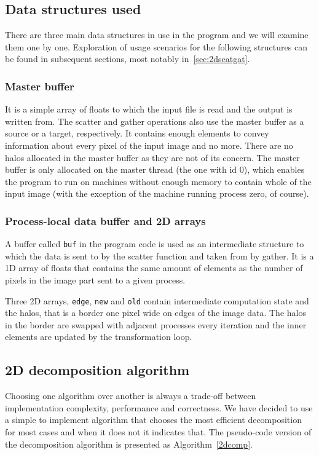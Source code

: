 \documentclass[11pt,a4paper]{article}
\begin{document}
\subsection{Data structures used}
There are three main data structures in use in the program and we will examine them one by one.
Exploration of usage scenarios for the following structures can be found in subsequent sections, most notably in~\ref{sec:2dscatgat}.

\subsubsection{Master buffer}
It is a simple array of floats to which the input file is read and the output is written from. 
The scatter and gather operations also use the master buffer as a source or a target, respectively. 
It contains enough elements to convey information about every pixel of the input image and no more. 
There are no halos allocated in the master buffer as they are not of its concern. 
The master buffer is only allocated on the master thread (the one with id 0), which enables the program to run on machines without enough memory to contain whole of the input image (with the exception of the machine running process zero, of course).

\subsubsection{Process-local data buffer and 2D arrays}
A buffer called \texttt{buf} in the program code is used as an intermediate structure to which the data is sent to by the scatter function and taken from by gather. 
It is a 1D array of floats that contains the same amount of elements as the number of pixels in the image part sent to a given process. 

Three 2D arrays, \texttt{edge}, \texttt{new} and \texttt{old} contain intermediate computation state and the halos, that is a border one pixel wide on edges of the image data. The halos in the border are swapped with adjacent processes every iteration and the inner elements are updated by the transformation loop.

\subsection{2D decomposition algorithm}
\label{sec:2ddec}
Choosing one algorithm over another is always a trade-off between implementation complexity, performance and correctness. We have decided to use a simple to implement algorithm that chooses the most efficient decomposition for most cases and when it does not it indicates that. The pseudo-code version of the decomposition algorithm is presented as Algorithm~\ref{2dcomp}.
\end{document}
